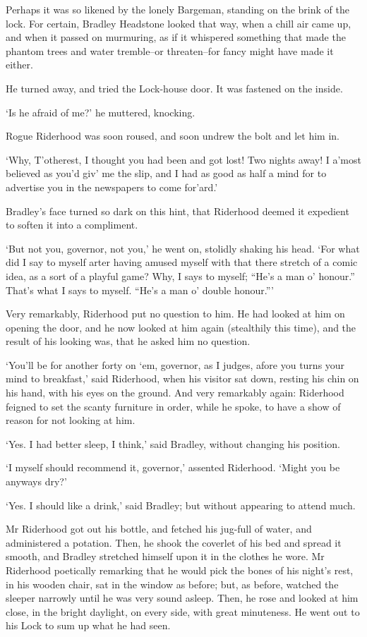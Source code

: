 Perhaps it was so likened by the lonely Bargeman, standing on the brink
of the lock. For certain, Bradley Headstone looked that way, when a
chill air came up, and when it passed on murmuring, as if it
whispered something that made the phantom trees and water tremble--or
threaten--for fancy might have made it either.

He turned away, and tried the Lock-house door. It was fastened on the
inside.

‘Is he afraid of me?’ he muttered, knocking.

Rogue Riderhood was soon roused, and soon undrew the bolt and let him
in.

‘Why, T’otherest, I thought you had been and got lost! Two nights away!
I a’most believed as you’d giv’ me the slip, and I had as good as half a
mind for to advertise you in the newspapers to come for’ard.’

Bradley’s face turned so dark on this hint, that Riderhood deemed it
expedient to soften it into a compliment.

‘But not you, governor, not you,’ he went on, stolidly shaking his head.
‘For what did I say to myself arter having amused myself with that there
stretch of a comic idea, as a sort of a playful game? Why, I says to
myself; “He’s a man o’ honour.” That’s what I says to myself. “He’s a
man o’ double honour.”’

Very remarkably, Riderhood put no question to him. He had looked at him
on opening the door, and he now looked at him again (stealthily this
time), and the result of his looking was, that he asked him no question.

‘You’ll be for another forty on ‘em, governor, as I judges, afore you
turns your mind to breakfast,’ said Riderhood, when his visitor sat
down, resting his chin on his hand, with his eyes on the ground. And
very remarkably again: Riderhood feigned to set the scanty furniture in
order, while he spoke, to have a show of reason for not looking at him.

‘Yes. I had better sleep, I think,’ said Bradley, without changing his
position.

‘I myself should recommend it, governor,’ assented Riderhood. ‘Might you
be anyways dry?’

‘Yes. I should like a drink,’ said Bradley; but without appearing to
attend much.

Mr Riderhood got out his bottle, and fetched his jug-full of water,
and administered a potation. Then, he shook the coverlet of his bed and
spread it smooth, and Bradley stretched himself upon it in the clothes
he wore. Mr Riderhood poetically remarking that he would pick the bones
of his night’s rest, in his wooden chair, sat in the window as before;
but, as before, watched the sleeper narrowly until he was very sound
asleep. Then, he rose and looked at him close, in the bright daylight,
on every side, with great minuteness. He went out to his Lock to sum up
what he had seen.

